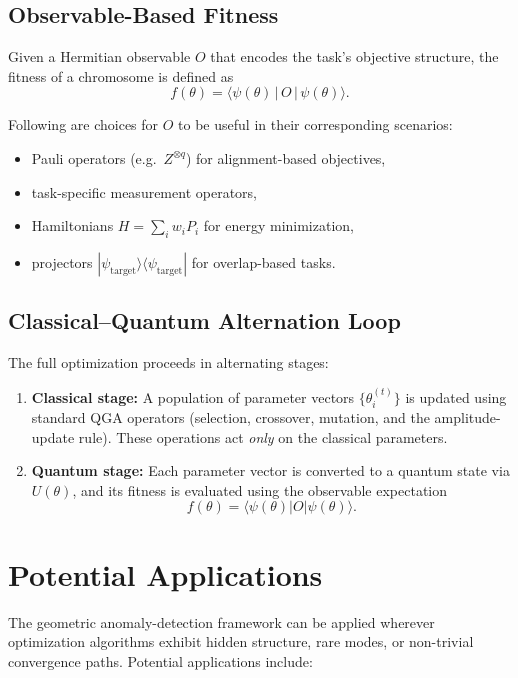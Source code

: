 \documentclass{article}
\begin{document}
\subsection*{Observable-Based Fitness}
Given a Hermitian observable $O$ that encodes the task's objective structure, the fitness of a chromosome is defined as
\[
f(\theta)
    = \langle \psi(\theta)\,|\, O \,|\, \psi(\theta) \rangle.
\]

Following are choices for $O$ to be useful in their corresponding scenarios:
\begin{itemize}
    \item Pauli operators (e.g.\ $Z^{\otimes q}$) for alignment-based
    objectives,
    \item task-specific measurement operators,
    \item Hamiltonians $H = \sum_i w_i P_i$ for energy minimization,
    \item projectors $|\psi_{\mathrm{target}}\rangle\langle
          \psi_{\mathrm{target}}|$ for overlap-based tasks.
\end{itemize}



\subsection*{Classical–Quantum Alternation Loop}
The full optimization proceeds in alternating stages:
\begin{enumerate}
    \item \textbf{Classical stage:} A population of parameter vectors
    $\{\theta_i^{(t)}\}$ is updated using standard QGA operators (selection, crossover, mutation, and the amplitude-update rule).     These operations act \emph{only} on the classical parameters.

    \item \textbf{Quantum stage:} Each parameter vector is converted to a quantum state via $U(\theta)$, and its fitness is evaluated using the observable expectation
    \[
    f(\theta) = \langle \psi(\theta)|O|\psi(\theta)\rangle.
    \]

\end{enumerate}

 \section{Potential Applications}

The geometric anomaly-detection framework can be applied wherever optimization algorithms exhibit hidden structure, rare modes, or non-trivial convergence paths. Potential applications include:
\end{document}

